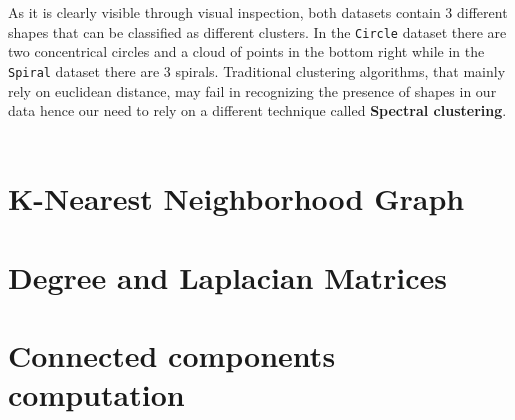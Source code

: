 \documentclass{article}
\numberwithin{equation}{section}
\theoremstyle{definition}
\theoremstyle{plain}
\theoremstyle{definition}
\theoremstyle{remark}
\begin{document}
As it is clearly visible through visual inspection, both datasets contain \(3\) different shapes that can be classified as different clusters. In the \texttt{Circle} dataset there are two concentrical circles and a cloud of points in the bottom right while in the \texttt{Spiral} dataset there are 3 spirals. Traditional clustering algorithms, that mainly rely on euclidean distance, may fail in recognizing the presence of shapes in our data hence our need to rely on a different technique called \textbf{Spectral clustering}. 
\\
\\

\section{K-Nearest Neighborhood Graph}

\section{Degree and Laplacian Matrices}

\section{Connected components computation}


\end{document}

